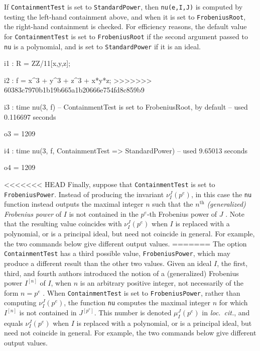 \documentclass{amsart}
\begin{document}
If {\tt ContainmentTest} is set to {\tt StandardPower}, then {\tt nu(e,I,J)} is computed by testing the left-hand containment above, and when it is set to {\tt FrobeniusRoot}, the right-hand containment is checked. 
For efficiency reasons, the default value for {\tt ContainmentTest} is set to  {\tt FrobeniusRoot} if the second argument passed to {\tt nu} is a polynomial, and is set to {\tt StandardPower} if it is an ideal. 

{\small
{}
\begin{MyVerbatim}

i1 : R = ZZ/11[x,y,z];

i2 : f = x^3 + y^3 + z^3 + x*y*z;
>>>>>>> 60383c7970b1b19b665a1b20666e754fd8c859b9

i3 : time nu(3, f) -- ContainmentTest is set to FrobeniusRoot, by default
     -- used 0.116697 seconds

o3 = 1209

i4 : time nu(3, f, ContainmentTest => StandardPower)
     -- used 9.65013 seconds

o4 = 1209
\end{MyVerbatim}
}
\medspace


<<<<<<< HEAD
Finally, suppose that {\tt ContainmentTest} is set to {\tt FrobeniusPower}.  Instead of producing the invariant $\nu_I^J(p^e)$, in this case the {\tt nu} function instead outputs the maximal integer $n$ such that the $n^{\textrm{th}}$ \emph{(generalized) Frobenius power} of $I$ is not contained in the $p^e$-th Frobenius power of $J$ \cite{hernandez+etal.frobenius_powers}.
Note that the resulting value coincides with $\nu_I^J(p^e)$ when $I$ is replaced with a polynomial, or is a principal ideal, but need not coincide in general.
For example, the two commands below give different output values.
=======
The option {\tt ContainmentTest} has a third possible value, {\tt FrobeniusPower}, which may produce a different result than the other two values.  
Given an ideal $I$, the first, third, and fourth authors introduced the notion of a (generalized) Frobenius power $I^{[n]}$ of $I$, when $n$ is an arbitrary positive integer, not necessarily of the form $n = p^e$ \cite{hernandez+etal.frobenius_powers}.    
When {\tt ContainmentTest} is set to {\tt FrobeniusPower}, rather than  computing $\nu_I^J(p^e)$, the function {\tt nu} computes the 
maximal integer $n$ for which $I^{[n]}$ is not contained in $J^{[p^e]}$.  This number is denoted $\mu_I^J(p^e)$ in \emph{loc.\ cit.}, and equals $\nu_I^J(p^e)$ when $I$ is replaced with a polynomial, or is a principal ideal, but need not coincide in general. 
For example, the two commands below give different output values. 
\end{document}
